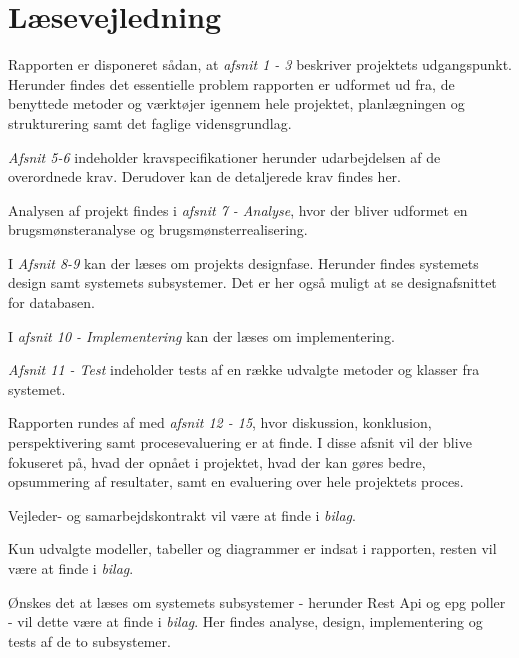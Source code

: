 \section{Læsevejledning}

Rapporten er disponeret sådan, at \textit{afsnit 1 - 3} beskriver projektets udgangspunkt. Herunder findes det essentielle problem rapporten er udformet ud fra, de benyttede metoder og værktøjer igennem hele projektet, planlægningen og strukturering samt det faglige vidensgrundlag.

\textit{Afsnit 5-6} indeholder kravspecifikationer herunder udarbejdelsen af de overordnede krav. Derudover kan de detaljerede krav findes her.

Analysen af projekt findes i \textit{afsnit 7 - Analyse}, hvor der bliver udformet en brugsmønsteranalyse og brugsmønsterrealisering.

I \textit{Afsnit 8-9} kan der læses om projekts designfase. Herunder findes systemets design samt systemets subsystemer. Det er her også muligt at se designafsnittet for databasen.

I \textit{afsnit 10 - Implementering} kan der læses om implementering.

\textit{Afsnit 11 - Test} indeholder tests af en række udvalgte metoder og klasser fra systemet.

Rapporten rundes af med \textit{afsnit 12 - 15}, hvor diskussion, konklusion, perspektivering samt procesevaluering er at finde. I disse afsnit vil der blive fokuseret på, hvad der opnået i projektet, hvad der kan gøres bedre, opsummering af resultater, samt en evaluering over hele projektets proces.

Vejleder- og samarbejdskontrakt vil være at finde i \textit{bilag}.

Kun udvalgte modeller, tabeller og diagrammer er indsat i rapporten, resten vil være at finde i \textit{bilag}.

Ønskes det at læses om systemets subsystemer - herunder Rest Api og epg poller - vil dette være at finde i \textit{bilag}. Her findes analyse, design, implementering og tests af de to subsystemer.
